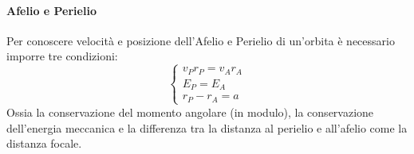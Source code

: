 \documentclass{article}
\begin{document}
\paragraph{Afelio e Perielio}
Per conoscere velocità e posizione dell'Afelio e Perielio di un'orbita è necessario imporre tre condizioni:
\[\left\{\begin{array}{l}
    v_Pr_P=v_Ar_A  \\
    E_P=E_A  \\
    r_P-r_A=a  
\end{array}\right.\]
Ossia la conservazione del momento angolare (in modulo), la conservazione dell'energia meccanica e la differenza tra la distanza al perielio e all'afelio come la distanza focale.
\end{document}
